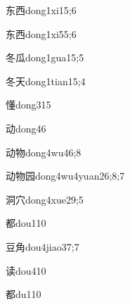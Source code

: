 \begin{verbete}{东西}{dong1xi1}{5;6}
\end{verbete}

\begin{verbete}{东西}{dong1xi5}{5;6}
\end{verbete}

\begin{verbete}{冬瓜}{dong1gua1}{5;5}
\end{verbete}

\begin{verbete}{冬天}{dong1tian1}{5;4}
\end{verbete}

\begin{verbete}{懂}{dong3}{15}
\end{verbete}

\begin{verbete}{动}{dong4}{6}
\end{verbete}

\begin{verbete}{动物}{dong4wu4}{6;8}
\end{verbete}

\begin{verbete}{动物园}{dong4wu4yuan2}{6;8;7}
\end{verbete}

\begin{verbete}{洞穴}{dong4xue2}{9;5}
\end{verbete}

\begin{verbete}{都}{dou1}{10}
\end{verbete}

\begin{verbete}{豆角}{dou4jiao3}{7;7}
\end{verbete}

\begin{verbete}{读}{dou4}{10}
\end{verbete}

\begin{verbete}{都}{du1}{10}
\end{verbete}

